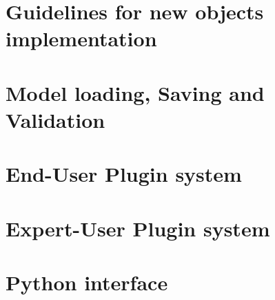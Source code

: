 \documentclass[a4paper,twoside,openright,makeidx,12pt]{book}
\begin{document}
\chapter{Guidelines for new objects implementation}
\label{Sec:DDD-GuidelinesForClasses}


\newpage
\chapter{Model loading, Saving and Validation}
\label{Sec:DDD-ModelLoading}






\newpage
\chapter{End-User Plugin system}
\label{Sec:DDD-EndUserPluginsystem}

\newpage
\chapter{Expert-User Plugin system}
\label{Sec:DDD-ExpertUser-Pluginsystem}


\newpage
\chapter{Python interface}
\label{Sec:DDD-pyInterface}

%
\end{document}
